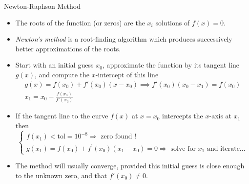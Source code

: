 \documentclass{beamer}
\begin{document}
\begin{frame}[fragile]{Newton-Raphson Method}
	\begin{itemize}
		\item The roots of the function (or zeros) are the $x_i$ solutions of $f(x) = 0$.
		\item \emph{Newton's method} is a root-finding algorithm which produces successively better approximations of the roots.
		\item Start with an initial guess $x_0$, approximate the function by its tangent line $g(x)$, and compute the $x$-intercept of this line
		\begin{gather*}
			g(x) = f(x_0) + f'(x_0)(x-x_0) \implies  f'(x_0)(x_0-x_1)=f(x_0)\\
			x_1=x_0-\frac {f(x_0)}{f'(x_0)}
		\end{gather*}
		\item If the tangent line to the curve $f(x)$ at $x = x_0$ intercepts the $x$-axis at $x_{1}$ then
		\begin{equation*}
			\begin{cases}
				f(x_1) < \text{tol}=10^{-8} \Rightarrow \text{ zero found !}\\
				g(x_1) = f(x_0) + f^{'}(x_0)(x_1-x_0) = 0 \Rightarrow \text{ solve for
				}x_1\text{ and iterate...}
			\end{cases}
		\end{equation*}
		\item The method will usually converge, provided this initial guess is close enough to the unknown zero, and that $f'(x_0) \neq 0$.
	\end{itemize}
\end{frame}
\end{document}
